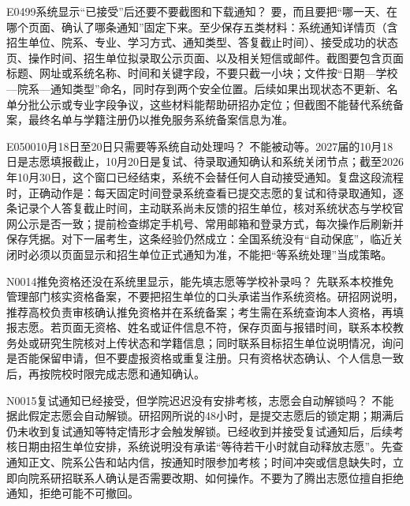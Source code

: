 \begin{qa}{E0499}{系统显示“已接受”后还要不要截图和下载通知？}
要，而且要把“哪一天、在哪个页面、确认了哪条通知”固定下来。至少保存五类材料：系统通知详情页（含招生单位、院系、专业、学习方式、通知类型、答复截止时间）、接受成功的状态页、操作时间、招生单位拟录取公示页面、以及相关短信或邮件。截图要包含页面标题、网址或系统名称、时间和关键字段，不要只截一小块；文件按“日期—学校—院系—通知类型”命名，同时存到两个安全位置。后续如果出现状态不更新、名单分批公示或专业字段争议，这些材料能帮助研招办定位；但截图不能替代系统备案，最终名单与学籍注册仍以推免服务系统备案信息为准。
\end{qa}

\begin{qa}{E0500}{10月18日至20日只需要等系统自动处理吗？}
不能被动等。2027届的10月18日是志愿填报截止，10月20日是复试、待录取通知确认和系统关闭节点；截至2026年10月30日，这个窗口已经结束，系统不会替任何人自动接受通知。复盘这段流程时，正确动作是：每天固定时间登录系统查看已提交志愿的复试和待录取通知，逐条记录个人答复截止时间，主动联系尚未反馈的招生单位，核对系统状态与学校官网公示是否一致；提前检查绑定手机号、常用邮箱和登录方式，每次操作后刷新并保存凭据。对下一届考生，这条经验仍然成立：全国系统没有“自动保底”，临近关闭时必须以页面显示和招生单位正式通知为准，不能把“等系统处理”当成策略。
\end{qa}

\begin{qa}{N0014}{推免资格还没在系统里显示，能先填志愿等学校补录吗？}
先联系本校推免管理部门核实资格备案，不要把招生单位的口头承诺当作系统资格。研招网说明，推荐高校负责审核确认推免资格并在系统备案；考生需在系统查询本人资格，再填报志愿。若页面无资格、姓名或证件信息不符，保存页面与报错时间，联系本校教务处或研究生院核对上传状态和学籍信息；同时联系目标招生单位说明情况，询问是否能保留申请，但不要虚报资格或重复注册。只有资格状态确认、个人信息一致后，再按院校时限完成志愿和通知确认。
\end{qa}

\begin{qa}{N0015}{复试通知已经接受，但学院迟迟没有安排考核，志愿会自动解锁吗？}
不能据此假定志愿会自动解锁。研招网所说的48小时，是提交志愿后的锁定期；期满后仍未收到复试通知等特定情形才会触发解锁。已经收到并接受复试通知后，后续考核日期由招生单位安排，系统说明没有承诺“等待若干小时就自动释放志愿”。先查通知正文、院系公告和站内信，按通知时限参加考核；时间冲突或信息缺失时，立即向院系研招联系人确认是否需要改期、如何操作。不要为了腾出志愿位擅自拒绝通知，拒绝可能不可撤回。
\end{qa}

